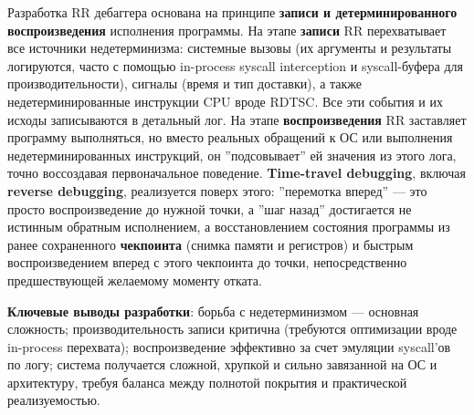 
Разработка RR дебаггера основана на принципе \textbf{записи и детерминированного
воспроизведения} исполнения программы. На этапе \textbf{записи} RR перехватывает все
источники недетерминизма: системные вызовы (их аргументы и результаты
логируются, часто с помощью in-process syscall interception и syscall-буфера
для производительности), сигналы (время и тип доставки), а также
недетерминированные инструкции CPU вроде RDTSC. Все эти события и их исходы
записываются в детальный лог. На этапе \textbf{воспроизведения} RR заставляет программу
выполняться, но вместо реальных обращений к ОС или выполнения
недетерминированных инструкций, он ''подсовывает'' ей значения из этого лога,
точно воссоздавая первоначальное поведение. \textbf{Time-travel debugging}, включая
\textbf{reverse debugging}, реализуется поверх этого: ''перемотка вперед'' — это просто
воспроизведение до нужной точки, а ''шаг назад'' достигается не истинным обратным
исполнением, а восстановлением состояния программы из ранее сохраненного
\textbf{чекпоинта} (снимка памяти и регистров) и быстрым воспроизведением вперед с этого
чекпоинта до точки, непосредственно предшествующей желаемому моменту отката.

\textbf{Ключевые выводы разработки}: борьба с недетерминизмом — основная сложность;
производительность записи критична (требуются оптимизации вроде in-process
перехвата); воспроизведение эффективно за счет эмуляции syscall'ов по логу;
система получается сложной, хрупкой и сильно завязанной на ОС и архитектуру,
требуя баланса между полнотой покрытия и практической реализуемостью.